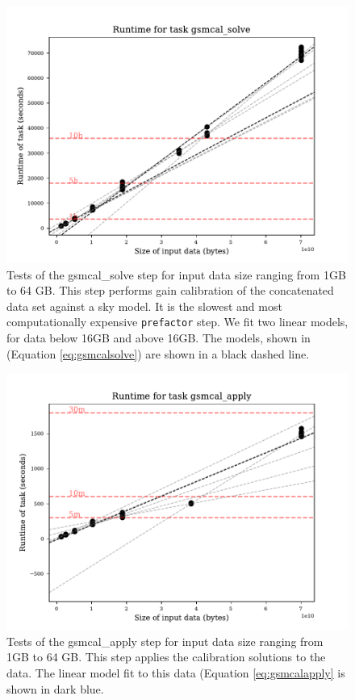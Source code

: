 \documentclass[preprint,5p]{elsarticle}
\begin{document}
\begin{figure}
    \includegraphics[width=0.95\linewidth]{figures/gsmcal_solve_size2.pdf}
      \caption{Tests of the gsmcal\_solve step for input data size ranging from 1GB to 64 GB. This step performs gain calibration of the concatenated data set against a sky model. It is the slowest and most computationally expensive \texttt{prefactor} step. We fit two linear models, for data below 16GB and above 16GB. The models, shown in  (Equation \ref{eq:gsmcalsolve}) are shown in a black dashed line.}
	\label{fig:gsmcalsolve_size}
\end{figure}

\begin{figure}
    \includegraphics[width=0.95\linewidth]{figures/gsmcal_apply_size.pdf}
      \caption{Tests of the gsmcal\_apply step for input data size ranging from 1GB to 64 GB. This step applies the calibration solutions to the data. The linear model fit to this data (Equation \ref{eq:gsmcalapply} is shown in dark blue.}
	\label{fig:gsmcalapply_size}
\end{figure}
\end{document}
